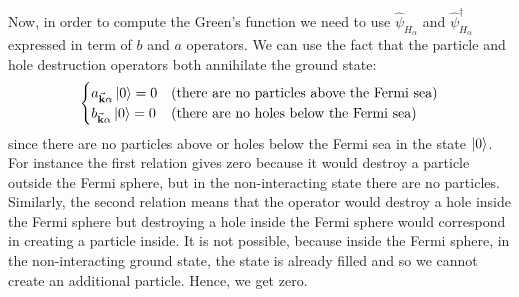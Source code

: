 \documentclass[../main/main.tex]{subfiles}
\begin{document}
Now, in order to compute the Green's function we need to use \(   \hat{\psi }_{H_ \alpha } \) and \(   \hat{\psi }_{H_ \alpha } ^\dag  \) expressed in term of \( b  \) and \( a \) operators.
We can use the fact that the particle and hole destruction operators both annihilate the ground state:
\begin{equation*}
  \begin{cases}
   a_{\va{k}\alpha } \ket{0} = 0 & \text{(there are no particles above the Fermi sea)} \\
   b_{\va{k}\alpha } \ket{0} = 0 & \text{(there are no holes below the Fermi sea)}
  \end{cases}
\end{equation*}
since there are no particles above or holes below the Fermi sea in the state \( \ket{0} \).
For instance the first relation gives zero because it would destroy a particle outside the Fermi sphere, but in the non-interacting state there are no particles. Similarly, the second relation means that the operator would destroy a hole inside the Fermi sphere but destroying a hole inside the Fermi sphere would correspond in creating a particle inside. It is not possible, because inside the Fermi sphere, in the non-interacting ground state, the state is already filled and so we cannot create an additional particle. Hence, we get zero.
\end{document}
